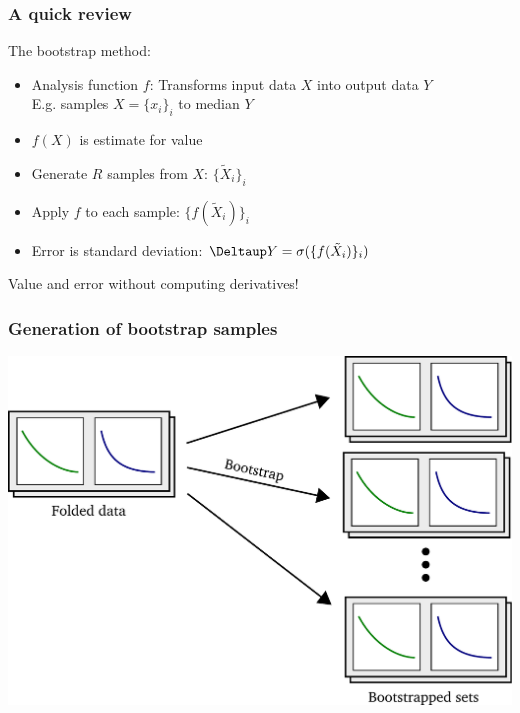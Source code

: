 \documentclass[english, fleqn]{beamer}
\begin{document}
\begin{frame}
    \frametitle{A quick review}
    The bootstrap method:
    \begin{itemize}
        \item
            Analysis function $f$: Transforms input data $X$ into output data
            $Y$ \\
            E.g. samples $X = \{x_i\}_i$ to median $Y$
        \item
            $f(X)$ is estimate for value
        \item
            Generate $R$ samples from $X$: $\{\tilde X_i\}_i$
        \item
            Apply $f$ to each sample: $\{f(\tilde X_i)\}_i$
        \item
            Error is standard deviation: $\Deltaup Y = \sigma(\{f(\tilde X_i)\}_i)$
    \end{itemize}

    Value and error without computing derivatives!
\end{frame}

\begin{frame}
    \frametitle{Generation of bootstrap samples}
    \begin{center}
        \includegraphics[scale=\scale]{sketches/03-bootstrap.pdf}
    \end{center}
\end{frame}
\end{document}
